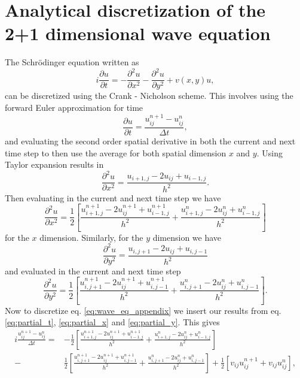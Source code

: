 \documentclass[english,notitlepage,reprint,nofootinbib]{revtex4-1}  %
\begin{document}
\newpage
\appendix

\section{Analytical discretization of the 2+1 dimensional wave equation} \label{appendix:analytic}

The Schrödinger equation written as
\begin{equation}
    i \frac{\partial u}{\partial t} = - \frac{\partial^2 u}{\partial x^2} - \frac{\partial^2 u}{\partial y^2} + v(x,y)u, \label{eq:wave_eq_appendix}
\end{equation}
can be discretized using the Crank - Nicholson scheme. This involves using the forward Euler approximation for time 
\begin{equation}
    \frac{\partial u}{\partial t} = \frac{u_{ij}^{n+1} - u_{ij}^n}{\Delta t}, \label{eq:partial_t}
\end{equation}
and evaluating the second order spatial derivative in both the current and next time step to then use the average for both spatial dimension $x$ and $y$. Using Taylor expansion results in
\begin{equation}
    \frac{\partial^2 u}{\partial x^2} = \frac{u_{i+1,j} -2u_{ij} + u_{i-1,j}}{h^2}.
\end{equation}
Then evaluating in the current and next time step we have
\begin{equation}
    \frac{\partial^2 u}{\partial x^2} = \frac{1}{2} \left[ \frac{u_{i+1,j}^{n+1} -2u_{ij}^{n+1} + u_{i-1,j}^{n+1}}{h^2} 
    + \frac{u_{i+1,j}^{n} -2u_{ij}^{n} + u_{i-1,j}^{n}}{h^2} \right] \label{eq:partial_x}
\end{equation}
for the $x$ dimension. Similarly, for the $y$ dimension we have
\begin{equation}
    \frac{\partial^2 u}{\partial y^2} = \frac{u_{i,j+1} -2u_{ij} + u_{i,j-1}}{h^2}
\end{equation}
and evaluated in the current and next time step
\begin{equation}
    \frac{\partial^2 u}{\partial y^2} = \frac{1}{2} \left[ \frac{u_{i,j+1}^{n+1} -2u_{ij}^{n+1} + u_{i,j-1}^{n+1}}{h^2}
    + \frac{u_{i,j+1}^{n} -2u_{ij}^{n} + u_{i,j-1}^{n}}{h^2} \right]. \label{eq:partial_y}
\end{equation}
Now to discretize eq. \ref{eq:wave_eq_appendix} we insert our results from eq. \ref{eq:partial_t}, \ref{eq:partial_x} and \ref{eq:partial_y}. This gives
\begin{align}
    i \frac{u_{ij}^{n+1} - u_{ij}^n}{\Delta t} 
    =& - \frac{1}{2} \left[ \frac{u_{i+1,j}^{n+1} -2u_{ij}^{n+1} + u_{i-1,j}^{n+1}}{h^2} 
    + \frac{u_{i+1,j}^{n} -2u_{ij}^{n} + u_{i-1,j}^{n}}{h^2} \right] \\
     -& \frac{1}{2} \left[ \frac{u_{i,j+1}^{n+1} -2u_{ij}^{n+1} + u_{i,j-1}^{n+1}}{h^2}
     + \frac{u_{i,j+1}^{n} -2u_{ij}^{n} + u_{i,j-1}^{n}}{h^2} \right]
     + \frac{1}{2} \left[ v_{ij}u_{ij}^{n+1} + v_{ij}u_{ij}^n \right], 
\end{align}
\end{document}
